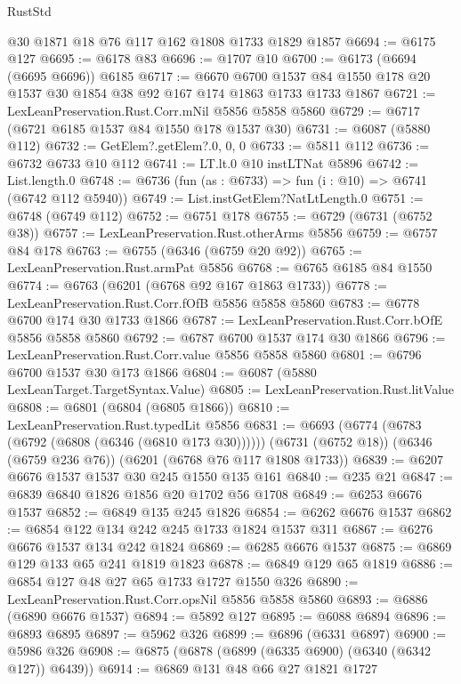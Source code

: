 \begin{lexlean}{RustStd}
\begin{coremodule}
    @30
    @1871
    @18
    @76
    @117
    @162
    @1808
    @1733
    @1829
    @1857
@6694 := @6175 @127
@6695 := @6178 @83
@6696 := @1707 @10
@6700 := @6173 (@6694 (@6695 @6696)) @6185
@6717 := @6670
    @6700
    @1537
    @84
    @1550
    @178
    @20
    @1537
    @30
    @1854
    @38
    @92
    @167
    @174
    @1863
    @1733
    @1733
    @1867
@6721 := LexLeanPreservation.Rust.Corr.mNil @5856 @5858 @5860
@6729 := @6717 (@6721 @6185 @1537 @84 @1550 @178 @1537 @30)
@6731 := @6087 (@5880 @112)
@6732 := GetElem?.getElem?.{0, 0, 0}
@6733 := @5811 @112
@6736 := @6732 @6733 @10 @112
@6741 := LT.lt.{0} @10 instLTNat @5896
@6742 := List.length.{0}
@6748 := @6736 (fun (as : @6733) => fun (i : @10) => @6741 (@6742 @112 @5940))
@6749 := List.instGetElem?NatLtLength.{0}
@6751 := @6748 (@6749 @112)
@6752 := @6751 @178
@6755 := @6729 (@6731 (@6752 @38))
@6757 := LexLeanPreservation.Rust.otherArms @5856
@6759 := @6757 @84 @178
@6763 := @6755 (@6346 (@6759 @20 @92))
@6765 := LexLeanPreservation.Rust.armPat @5856
@6768 := @6765 @6185 @84 @1550
@6774 := @6763 (@6201 (@6768 @92 @167 @1863 @1733))
@6778 := LexLeanPreservation.Rust.Corr.fOfB @5856 @5858 @5860
@6783 := @6778 @6700 @174 @30 @1733 @1866
@6787 := LexLeanPreservation.Rust.Corr.bOfE @5856 @5858 @5860
@6792 := @6787 @6700 @1537 @174 @30 @1866
@6796 := LexLeanPreservation.Rust.Corr.value @5856 @5858 @5860
@6801 := @6796 @6700 @1537 @30 @173 @1866
@6804 := @6087 (@5880 LexLeanTarget.TargetSyntax.Value)
@6805 := LexLeanPreservation.Rust.litValue
@6808 := @6801 (@6804 (@6805 @1866))
@6810 := LexLeanPreservation.Rust.typedLit @5856
@6831 := @6693
    (@6774 (@6783 (@6792 (@6808 (@6346 (@6810 @173 @30))))))
    (@6731 (@6752 @18))
    (@6346 (@6759 @236 @76))
    (@6201 (@6768 @76 @117 @1808 @1733))
@6839 := @6207 @6676 @1537 @1537 @30 @245 @1550 @135 @161
@6840 := @235 @21
@6847 := @6839 @6840 @1826 @1856 @20 @1702 @56 @1708
@6849 := @6253 @6676 @1537
@6852 := @6849 @135 @245 @1826
@6854 := @6262 @6676 @1537
@6862 := @6854 @122 @134 @242 @245 @1733 @1824 @1537 @311
@6867 := @6276 @6676 @1537 @134 @242 @1824
@6869 := @6285 @6676 @1537
@6875 := @6869 @129 @133 @65 @241 @1819 @1823
@6878 := @6849 @129 @65 @1819
@6886 := @6854 @127 @48 @27 @65 @1733 @1727 @1550 @326
@6890 := LexLeanPreservation.Rust.Corr.opsNil @5856 @5858 @5860
@6893 := @6886 (@6890 @6676 @1537)
@6894 := @5892 @127
@6895 := @6088 @6894
@6896 := @6893 @6895
@6897 := @5962 @326
@6899 := @6896 (@6331 @6897)
@6900 := @5986 @326
@6908 := @6875 (@6878 (@6899 (@6335 @6900) (@6340 (@6342 @127)) @6439))
@6914 := @6869 @131 @48 @66 @27 @1821 @1727

\end{coremodule}
\end{lexlean}
